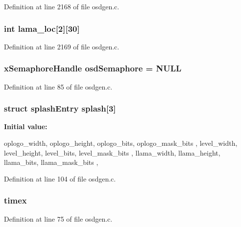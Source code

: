 \-Definition at line 2168 of file osdgen.\-c.

\hypertarget{group___o_s_d_g_e_n_module_ga35258f3e002e3b7d6dc3a50b458c1ed5}{
\subsubsection[{lama\-\_\-loc}]{\setlength{\rightskip}{0pt plus 5cm}int {\bf lama\-\_\-loc}\mbox{[}2\mbox{]}\mbox{[}30\mbox{]}}}\label{group___o_s_d_g_e_n_module_ga35258f3e002e3b7d6dc3a50b458c1ed5}


\-Definition at line 2169 of file osdgen.\-c.

\hypertarget{group___o_s_d_g_e_n_module_ga34f96a89a1ad6c4649787dbc18e218e5}{
\subsubsection[{osd\-Semaphore}]{\setlength{\rightskip}{0pt plus 5cm}x\-Semaphore\-Handle {\bf osd\-Semaphore} = \-N\-U\-L\-L}}\label{group___o_s_d_g_e_n_module_ga34f96a89a1ad6c4649787dbc18e218e5}


\-Definition at line 85 of file osdgen.\-c.

\hypertarget{group___o_s_d_g_e_n_module_gafd73dea95bd8cae01a8225936c4c302e}{
\subsubsection[{splash}]{\setlength{\rightskip}{0pt plus 5cm}struct {\bf splash\-Entry} {\bf splash}\mbox{[}3\mbox{]}}}\label{group___o_s_d_g_e_n_module_gafd73dea95bd8cae01a8225936c4c302e}
{\bfseries \-Initial value\-:}
\begin{DoxyCode}
 {
        {       oplogo_width,
                oplogo_height,
                oplogo_bits,
                oplogo_mask_bits },
        {       level_width,
                level_height,
                level_bits,
                level_mask_bits },
        {       llama_width,
                llama_height,
                llama_bits,
                llama_mask_bits },

}
\end{DoxyCode}


\-Definition at line 104 of file osdgen.\-c.

\hypertarget{group___o_s_d_g_e_n_module_gac6e460448d29f05aad59dc67c3035057}{
\subsubsection[{timex}]{ {\bf timex}}}\label{group___o_s_d_g_e_n_module_gac6e460448d29f05aad59dc67c3035057}


\-Definition at line 75 of file osdgen.\-c.


